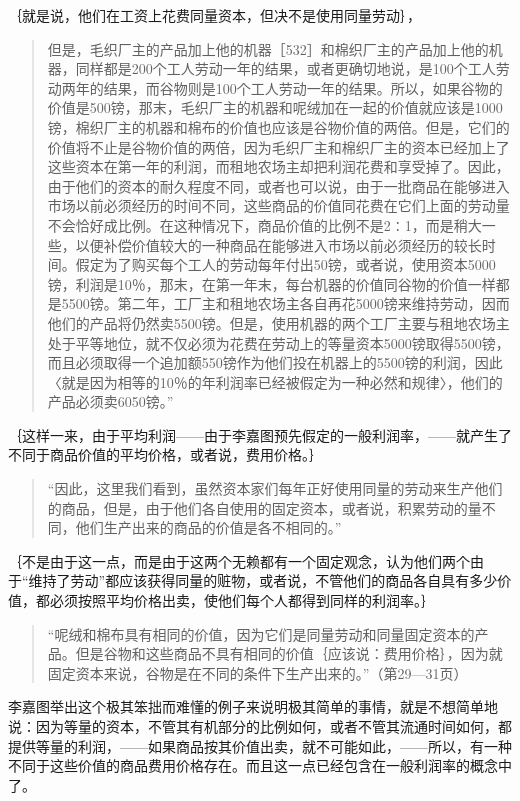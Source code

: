｛就是说，他们在工资上花费同量资本，但决不是使用同量劳动｝，

\begin{quote}{但是，毛织厂主的产品加上他的机器［532］和棉织厂主的产品加上他的机器，同样都是200个工人劳动一年的结果，或者更确切地说，是100个工人劳动两年的结果，而谷物则是100个工人劳动一年的结果。所以，如果谷物的价值是500镑，那末，毛织厂主的机器和呢绒加在一起的价值就应该是1000镑，棉织厂主的机器和棉布的价值也应该是谷物价值的两倍。但是，它们的价值将不止是谷物价值的两倍，因为毛织厂主和棉织厂主的资本已经加上了这些资本在第一年的利润，而租地农场主却把利润花费和享受掉了。因此，由于他们的资本的耐久程度不同，或者也可以说，由于一批商品在能够进入市场以前必须经历的时间不同，这些商品的价值同花费在它们上面的劳动量不会恰好成比例。在这种情况下，商品价值的比例不是2∶1，而是稍大一些，以便补偿价值较大的一种商品在能够进入市场以前必须经历的较长时间。假定为了购买每个工人的劳动每年付出50镑，或者说，使用资本5000镑，利润是10％，那末，在第一年末，每台机器的价值同谷物的价值一样都是5500镑。第二年，工厂主和租地农场主各自再花5000镑来维持劳动，因而他们的产品将仍然卖5500镑。但是，使用机器的两个工厂主要与租地农场主处于平等地位，就不仅必须为花费在劳动上的等量资本5000镑取得5500镑，而且必须取得一个追加额550镑作为他们投在机器上的5500镑的利润，因此〈就是因为相等的10％的年利润率已经被假定为一种必然和规律〉，他们的产品必须卖6050镑。”}\end{quote}

｛这样一来，由于平均利润——由于李嘉图预先假定的一般利润率，——就产生了不同于商品价值的平均价格，或者说，费用价格。｝

\begin{quote}{“因此，这里我们看到，虽然资本家们每年正好使用同量的劳动来生产他们的商品，但是，由于他们各自使用的固定资本，或者说，积累劳动的量不同，他们生产出来的商品的价值是各不相同的。”}\end{quote}

｛不是由于这一点，而是由于这两个无赖都有一个固定观念，认为他们两个由于“维持了劳动”都应该获得同量的赃物，或者说，不管他们的商品各自具有多少价值，都必须按照平均价格出卖，使他们每个人都得到同样的利润率。｝

\begin{quote}{“呢绒和棉布具有相同的价值，因为它们是同量劳动和同量固定资本的产品。但是谷物和这些商品不具有相同的价值｛应该说：费用价格｝，因为就固定资本来说，谷物是在不同的条件下生产出来的。”（第29—31页）}\end{quote}

李嘉图举出这个极其笨拙而难懂的例子来说明极其简单的事情，就是不想简单地说：因为等量的资本，不管其有机部分的比例如何，或者不管其流通时间如何，都提供等量的利润，——如果商品按其价值出卖，就不可能如此，——所以，有一种不同于这些价值的商品费用价格存在。而且这一点已经包含在一般利润率的概念中了。

